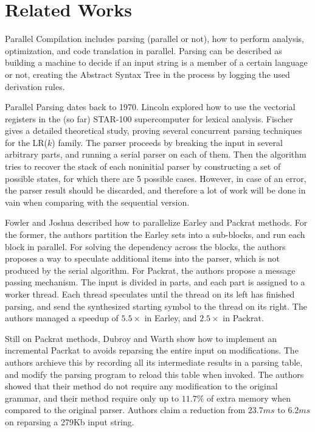 \documentclass[runningheads]{llncs}
\begin{document}
\section{Related Works} \label{sec:related}

Parallel Compilation includes parsing (parallel or not), how to perform
analysis, optimization, and code translation in parallel.  Parsing can be
described as building a machine to decide if an input string is a member of a
certain language or not, creating the Abstract Syntax Tree in the process by
logging the used derivation rules.

Parallel Parsing dates back to 1970. Lincoln \cite{Lincoln:1970:PPT:987475.987478}
explored how to use the vectorial registers in the (so far)
STAR-100 supercomputer for lexical analysis. Fischer
\cite{fischer1975parsing} gives a detailed theoretical study, proving
several concurrent parsing techniques for the LR($k$) family.
The parser proceeds by breaking the input in several arbitrary parts, and running a
serial parser on each of them. Then the algorithm tries to
recover the stack of each noninitial parser by constructing a set of
possible states, for which there are 5 possible cases. However, in case
of an error, the parser result should be discarded, and therefore a lot
of work will be done in vain when comparing with the sequential version.

Fowler and Joshua \cite{fowler2009parallel} described how to parallelize Earley
and Packrat methods. For the former, the authors partition the Earley sets into
a sub-blocks, and run each block in parallel. For solving the dependency across
the blocks, the authors proposes a way to speculate additional items into the
parser, which is not produced by the serial algorithm. For Packrat, the authors
propose a message passing mechanism.  The input is divided in parts, and each
part is assigned to a worker thread. Each thread speculates until the
thread on its left has finished parsing, and send the synthesized starting
symbol to the thread on its right. The authors managed a speedup of $5.5\times$
in Earley, and $2.5\times$ in Packrat.

Still on Packrat methods, Dubroy and Warth \cite{dubroy2017incremental} show
how to implement an incremental Pacrkat to avoids reparsing the entire input
on modifications. The authors archieve this by recording all its
intermediate results in a parsing table, and modify the parsing program to reload
this table when invoked. The authors showed that their method do not require
any modification to the original grammar, and their method require only
up to $11.7\%$ of extra memory when compared to the original parser. Authors
claim a reduction from $23.7ms$ to $6.2ms$ on reparsing a 279Kb input string.
\end{document}
